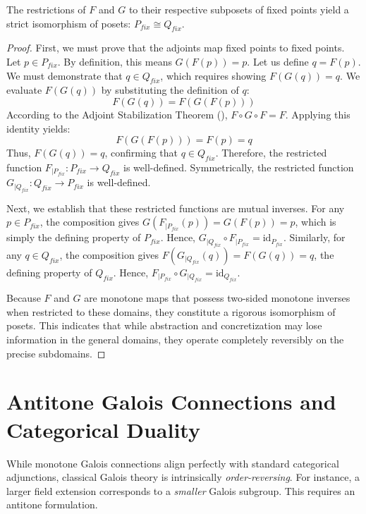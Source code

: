 \begin{theorem}
\label{thm:fixed_point_isomorphism}
The restrictions of $F$ and $G$ to their respective subposets of fixed points yield a strict isomorphism of posets: $P_{fix} \cong Q_{fix}$.
\end{theorem}
\begin{proof}
First, we must prove that the adjoints map fixed points to fixed points. Let $p \in P_{fix}$. By definition, this means $G(F(p)) = p$. Let us define $q = F(p)$. We must demonstrate that $q \in Q_{fix}$, which requires showing $F(G(q)) = q$.
We evaluate $F(G(q))$ by substituting the definition of $q$:
\[ F(G(q)) = F(G(F(p))) \]
According to the Adjoint Stabilization Theorem (), $F \circ G \circ F = F$. Applying this identity yields:
\[ F(G(F(p))) = F(p) = q \]
Thus, $F(G(q)) = q$, confirming that $q \in Q_{fix}$. Therefore, the restricted function $F_{|P_{fix}}: P_{fix} \to Q_{fix}$ is well-defined. Symmetrically, the restricted function $G_{|Q_{fix}}: Q_{fix} \to P_{fix}$ is well-defined.

Next, we establish that these restricted functions are mutual inverses.
For any $p \in P_{fix}$, the composition gives $G(F_{|P_{fix}}(p)) = G(F(p)) = p$, which is simply the defining property of $P_{fix}$. Hence, $G_{|Q_{fix}} \circ F_{|P_{fix}} = \text{id}_{P_{fix}}$.
Similarly, for any $q \in Q_{fix}$, the composition gives $F(G_{|Q_{fix}}(q)) = F(G(q)) = q$, the defining property of $Q_{fix}$. Hence, $F_{|P_{fix}} \circ G_{|Q_{fix}} = \text{id}_{Q_{fix}}$.

Because $F$ and $G$ are monotone maps that possess two-sided monotone inverses when restricted to these domains, they constitute a rigorous isomorphism of posets. This indicates that while abstraction and concretization may lose information in the general domains, they operate completely reversibly on the precise subdomains.
\end{proof}

\section{Antitone Galois Connections and Categorical Duality}

While monotone Galois connections align perfectly with standard categorical adjunctions, classical Galois theory is intrinsically \emph{order-reversing}. For instance, a larger field extension corresponds to a \emph{smaller} Galois subgroup. This requires an antitone formulation.

